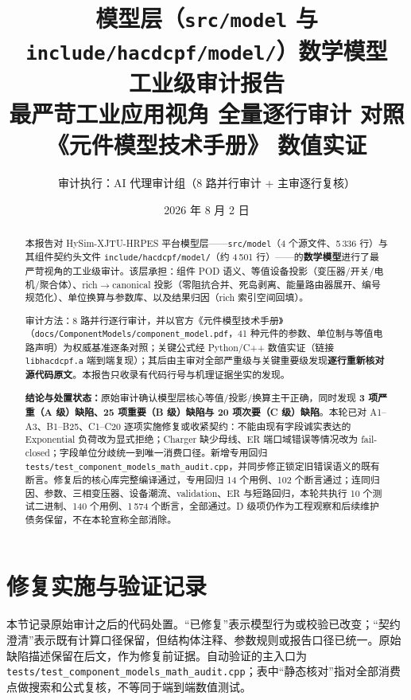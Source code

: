 \documentclass[11pt,a4paper,fontset=fandol]{ctexart}
\title{\textbf{模型层（\texttt{src/model} 与 \texttt{include/hacdcpf/model/}）数学模型\\工业级审计报告}\\[0.5em]
\large 最严苛工业应用视角 \textbar{} 全量逐行审计 \textbar{} 对照《元件模型技术手册》\textbar{} 数值实证}
\author{审计执行：AI 代理审计组（8 路并行审计 + 主审逐行复核）}
\date{2026 年 8 月 2 日}
\newcommand{\file}[1]{\texttt{#1}}
\begin{document}
\maketitle

\begin{abstract}
\noindent
本报告对 HySim-XJTU-HRPES 平台模型层——\file{src/model}（4 个源文件、5\,336 行）与其组件契约头文件 \file{include/hacdcpf/model/}（约 4\,501 行）——的\textbf{数学模型}进行了最严苛视角的工业级审计。该层承担：组件 POD 语义、等值设备投影（变压器/开关/电机/聚合体）、rich$\to$canonical 投影（零阻抗合并、死岛剥离、能量路由器展开、编号规范化）、单位换算与参数库、以及结果归因（rich 索引空间回填）。

审计方法：8 路并行逐行审计，并以官方《元件模型技术手册》（\file{docs/ComponentModels/component\_model.pdf}，41 种元件的参数、单位制与等值电路声明）为权威基准逐条对照；关键公式经 Python/C++ 数值实证（链接 \file{libhacdcpf.a} 端到端复现）；其后由主审对全部严重级与关键重要级发现\textbf{逐行重新核对源代码原文}。本报告只收录有代码行号与机理证据坐实的发现。

\textbf{结论与处置状态：}原始审计确认模型层核心等值/投影/换算主干正确，同时发现 \textbf{3 项严重（A 级）缺陷、25 项重要（B 级）缺陷与 20 项次要（C 级）缺陷}。本轮已对 A1--A3、B1--B25、C1--C20 逐项实施修复或收紧契约：不能由现有字段诚实表达的 Exponential 负荷改为显式拒绝；Charger 缺少母线、ER 端口域错误等情况改为 fail-closed；字段单位分歧统一到唯一消费口径。新增专用回归 \file{tests/test\_component\_models\_math\_audit.cpp}，并同步修正锁定旧错误语义的既有断言。修复后的核心库完整编译通过，专用回归 14 个用例、102 个断言通过；连同归因、参数、三相变压器、设备潮流、validation、ER 与短路回归，本轮共执行 10 个测试二进制、140 个用例、1\,574 个断言，全部通过。D 级项仍作为工程观察和后续维护债务保留，不在本轮宣称全部消除。
\end{abstract}

\tableofcontents
\newpage

\section{修复实施与验证记录}
\label{sec:remediation}

本节记录原始审计之后的代码处置。``已修复''表示模型行为或校验已改变；``契约澄清''表示既有计算口径保留，但结构体注释、参数规则或报告口径已统一。原始缺陷描述保留在后文，作为修复前证据。自动验证的主入口为
\file{tests/test\_component\_models\_math\_audit.cpp}；表中``静态核对''指对全部消费点做搜索和公式复核，不等同于端到端数值测试。
\end{document}
